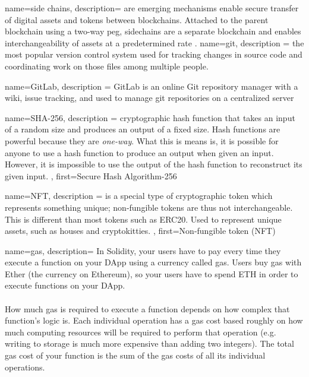 {
	name={side chains},
	description= {
	are emerging mechanisms enable secure transfer of digital assets and tokens between blockchains. Attached to the parent blockchain using a two-way peg, sidechains are a separate blockchain and enables interchangeability of assets at a predetermined rate \cite{sideChains:Online}. 
	}
}
{
	name={git},
	description ={
			the most popular version control system used for tracking changes in source code and coordinating work on those files among multiple people.
	}
}


{
	name={GitLab},
	description ={
		GitLab is an online Git repository manager with a wiki, issue tracking, and used to manage \gls{git} repositories on a centralized server
	}
}

{
	name={SHA-256},
	description ={
		cryptographic hash function that takes an input of a random size and produces an output of a fixed size. Hash functions are powerful because they are \textit{one-way}. What this is means is, it is possible for anyone to use a hash function to produce an output when given an input. However, it is impossible to use the output of the hash function to reconstruct its given input.
	},
	first={Secure Hash Algorithm-256}
}


{
	name={NFT},
	description ={
		is a special type of cryptographic token which represents something unique; non-fungible tokens are thus not interchangeable. This is different than most tokens such as ERC20. Used to represent unique assets, such as houses and cryptokitties.
	},
	first={Non-fungible token (NFT)}
}

{
	name={gas},
	description={
	In Solidity, your users have to pay every time they execute a function on your DApp using a currency called gas. Users buy gas with Ether (the currency on Ethereum), so your users have to spend ETH in order to execute functions on your DApp. \\ \\ How much gas is required to execute a function depends on how complex that function's logic is. Each individual operation has a gas cost based roughly on how much computing resources will be required to perform that operation (e.g. writing to storage is much more expensive than adding two integers). The total gas cost of your function is the sum of the gas costs of all its individual operations.
	}
}
\makeglossaries

